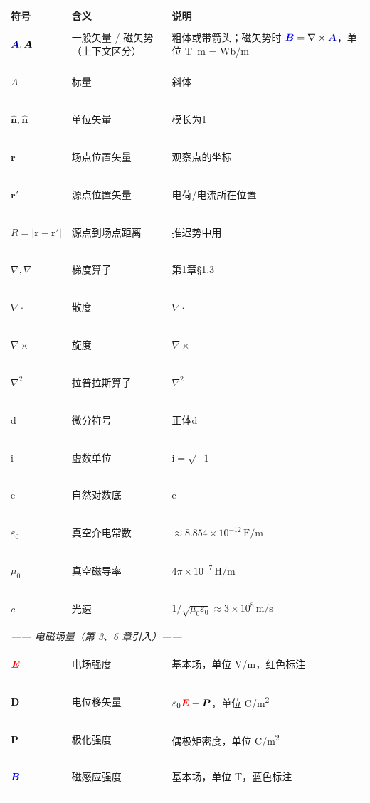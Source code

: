 \documentclass[11pt,a4paper,openany,oneside]{book}
\newcommand{\diff}{\mathrm{d}}
\newcommand{\vecE}{\textcolor{red}{\vect{E}}}
\newcommand{\vecB}{\textcolor{blue}{\vect{B}}}
\newcommand{\vecA}{\textcolor{blue!70!black}{\vect{A}}}
\newcommand{\ii}{\mathrm{i}}
\newcommand{\ee}{\mathrm{e}}
\newcommand{\eps}{\varepsilon}
\newcommand{\vect}[1]{\bm{#1}}
\newcommand{\unitvec}[1]{\hat{\vect{#1}}}
\newcommand{\grad}{\nabla}
\newcommand{\curl}{\nabla\times}
\newcommand{\divg}{\nabla\cdot}
\newcommand{\lap}{\nabla^2}
\begin{document}
\begin{center}
\small
\begin{tabular}{@{}llp{}@{}}
\toprule
\textbf{符号} & \textbf{含义} & \textbf{说明} \\
\midrule
\hypertarget{symA}{$\vecA, \bm{A}$} & 一般矢量 / 磁矢势（上下文区分） & 粗体或带箭头；磁矢势时 $\vecB = \curl\vecA$，单位 \si{T.m} = \si{Wb/m} \\
\hypertarget{symScalarA}{$A$} & 标量 & 斜体 \\
\hypertarget{symnhat}{$\hat{\vect{n}}, \unitvec{n}$} & 单位矢量 & 模长为1 \\
\hypertarget{symr}{$\vect{r}$} & 场点位置矢量 & 观察点的坐标 \\
\hypertarget{symrprime}{$\vect{r}'$} & 源点位置矢量 & 电荷/电流所在位置 \\
\hypertarget{symR}{$R = |\vect{r}-\vect{r}'|$} & 源点到场点距离 & 推迟势中用 \\
\hypertarget{symgrad}{$\grad, \nabla$} & 梯度算子 & 第1章\S1.3 \\
\hypertarget{symdivg}{$\divg$} & 散度 & $\nabla\cdot$ \\
\hypertarget{symcurl}{$\curl$} & 旋度 & $\nabla\times$ \\
\hypertarget{symlap}{$\lap$} & 拉普拉斯算子 & $\nabla^2$ \\
\hypertarget{symdiff}{$\diff$} & 微分符号 & 正体$\mathrm{d}$ \\
\hypertarget{symii}{$\ii$} & 虚数单位 & $\mathrm{i}=\sqrt{-1}$ \\
\hypertarget{symee}{$\ee$} & 自然对数底 & $\mathrm{e}$ \\
\hypertarget{symeps0}{$\eps_0$} & 真空介电常数 & $\approx 8.854\times 10^{-12}\,\mathrm{F/m}$ \\
\hypertarget{symmuz0}{$\mu_0$} & 真空磁导率 & $4\pi\times 10^{-7}\,\mathrm{H/m}$ \\
\hypertarget{symc}{$c$} & 光速 & $1/\sqrt{\mu_0\eps_0}\approx 3\times 10^8\,\mathrm{m/s}$ \\
\midrule
\multicolumn{3}{l}{\textit{—— 电磁场量（第 3、6 章引入）——}} \\
\hypertarget{symE}{$\vecE$} & 电场强度 & 基本场，单位 \si{V/m}，红色标注 \\
\hypertarget{symD}{$\vect{D}$} & 电位移矢量 & $\eps_0\vecE + \vect{P}$，单位 \si{C/m^2} \\
\hypertarget{symP}{$\vect{P}$} & 极化强度 & 偶极矩密度，单位 \si{C/m^2} \\
\hypertarget{symB}{$\vecB$} & 磁感应强度 & 基本场，单位 \si{T}，蓝色标注 \\

\end{tabular}
\end{center}
\end{document}
